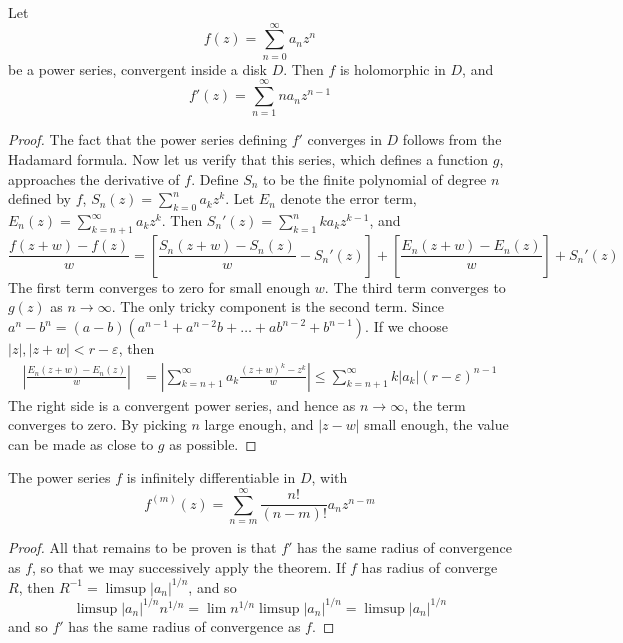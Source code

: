 \begin{theorem}
    Let
    \[ f(z) = \sum_{n = 0}^\infty a_n z^n \]
    be a power series, convergent inside a disk $D$. Then $f$ is holomorphic in $D$, and
    \[ f'(z) = \sum_{n = 1}^\infty n a_n z^{n-1} \]
\end{theorem}
\begin{proof}
    The fact that the power series defining $f'$ converges in $D$ follows from the Hadamard formula. Now let us verify that this series, which defines a function $g$, approaches the derivative of $f$. Define $S_n$ to be the finite polynomial of degree $n$ defined by $f$, $S_n(z) = \sum_{k = 0}^n a_k z^k$. Let $E_n$ denote the error term, $E_n(z) = \sum_{k = n+1}^\infty a_k z^k$. Then $S_n'(z) = \sum_{k = 1}^n k a_k z^{k-1}$, and
    \[ \frac{f(z + w) - f(z)}{w} = \left[ \frac{S_n(z + w) - S_n(z)}{w} - S_n'(z) \right] + \left[ \frac{E_n(z + w) - E_n(z)}{w} \right] + S_n'(z) \]
    The first term converges to zero for small enough $w$. The third term converges to $g(z)$ as $n \to \infty$. The only tricky component is the second term. Since $a^n - b^n = (a - b)(a^{n-1} + a^{n-2}b + \dots + ab^{n-2} + b^{n-1})$. If we choose $|z|, |z + w| < r - \varepsilon$, then
    \begin{align*}
        \left| \frac{E_n(z + w) - E_n(z)}{w} \right| &= \left| \sum_{k = n + 1}^\infty a_k \frac{(z + w)^k - z^k}{w} \right| \leq \sum_{k = n + 1}^\infty k |a_k| (r - \varepsilon)^{n-1}
    \end{align*}
    The right side is a convergent power series, and hence as $n \to \infty$, the term converges to zero. By picking $n$ large enough, and $|z - w|$ small enough, the value can be made as close to $g$ as possible.
\end{proof}

\begin{corollary}
    The power series $f$ is infinitely differentiable in $D$, with
    \[ f^{(m)}(z) = \sum_{n = m}^\infty \frac{n!}{(n - m)!} a_n z^{n-m} \]
\end{corollary}
\begin{proof}
    All that remains to be proven is that $f'$ has the same radius of convergence as $f$, so that we may successively apply the theorem. If $f$ has radius of converge $R$, then $R^{-1} = \limsup |a_n|^{1/n}$, and so
    \[ \limsup |a_n|^{1/n} n^{1/n} = \lim n^{1/n} \limsup |a_n|^{1/n} = \limsup |a_n|^{1/n} \]
    and so $f'$ has the same radius of convergence as $f$.
\end{proof}

